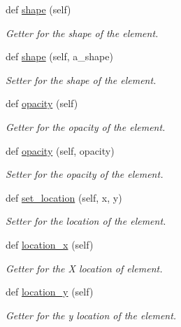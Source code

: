 \begin{DoxyCompactItemize}
def \mbox{\hyperlink{classbridges_1_1element__visualizer_1_1_element_visualizer_a79ee08777449e532ff2131785647b515}{shape}} (self)
\begin{DoxyCompactList}\small\item\em Getter for the shape of the element. \end{DoxyCompactList}\item 
def \mbox{\hyperlink{classbridges_1_1element__visualizer_1_1_element_visualizer_af4bd377b8fb9a35c10740de7ea8c5eee}{shape}} (self, a\+\_\+shape)
\begin{DoxyCompactList}\small\item\em Setter for the shape of the element. \end{DoxyCompactList}\item 
def \mbox{\hyperlink{classbridges_1_1element__visualizer_1_1_element_visualizer_a64288f56aa9cb5f3ccf703d696df1c04}{opacity}} (self)
\begin{DoxyCompactList}\small\item\em Getter for the opacity of the element. \end{DoxyCompactList}\item 
def \mbox{\hyperlink{classbridges_1_1element__visualizer_1_1_element_visualizer_ab282e5e9b704c8ccf923cc117b541b3a}{opacity}} (self, opacity)
\begin{DoxyCompactList}\small\item\em Setter for the opacity of the element. \end{DoxyCompactList}\item 
def \mbox{\hyperlink{classbridges_1_1element__visualizer_1_1_element_visualizer_a7aef4402f2de7e88a3260bbec3a708a7}{set\+\_\+location}} (self, x, y)
\begin{DoxyCompactList}\small\item\em Setter for the location of the element. \end{DoxyCompactList}\item 
def \mbox{\hyperlink{classbridges_1_1element__visualizer_1_1_element_visualizer_a10fc24a04e43afcb393f3444bd93f5d9}{location\+\_\+x}} (self)
\begin{DoxyCompactList}\small\item\em Getter for the X location of element. \end{DoxyCompactList}\item 
def \mbox{\hyperlink{classbridges_1_1element__visualizer_1_1_element_visualizer_a687747f04ae17dea9d15706602688a32}{location\+\_\+y}} (self)
\begin{DoxyCompactList}\small\item\em Getter for the y location of the element. \end{DoxyCompactList}\end{DoxyCompactItemize}
